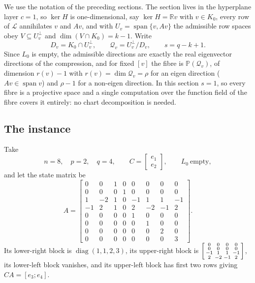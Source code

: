 \documentclass[journal]{IEEEtran}
\theoremstyle{plainn}
\theoremstyle{remark}
\begin{document}
We use the notation of the preceding sections. The section lives in the hyperplane layer $c=1$, so
$\ker H$ is one-dimensional, say $\ker H=\mathbb{R}v$ with $v\in K_0$, every row of $\mathcal{L}$
annihilates $v$ and $Av$, and with $U_v=\operatorname{span}\{v,Av\}$ the admissible row spaces obey
$V\subseteq U_v^{\perp}$ and $\dim(V\cap K_0)=k-1$. Write
\begin{equation}\label{sec6:eq:defs}
D_v=K_0\cap U_v^{\perp},\qquad \mathcal{Q}_v=U_v^{\perp}/D_v,\qquad s=q-k+1 .
\end{equation}
Since $L_0$ is empty, the admissible directions are exactly the real eigenvector directions of the
compression, and for fixed $[v]$ the fibre is $\mathbb{P}(\mathcal{Q}_v)$, of dimension $r(v)-1$ with
$r(v)=\dim\mathcal{Q}_v=\rho$ for an eigen direction ($Av\in\operatorname{span}v$) and $\rho-1$ for a
non-eigen direction. In this section $s=1$, so every fibre is a projective space and a single
computation over the function field of the fibre covers it entirely: no chart decomposition is needed.

\subsection{The instance}\label{sec6:sub:instance}

Take
\begin{equation}\label{sec6:eq:data}
n=8,\quad p=2,\quad q=4,\qquad
C=\begin{bmatrix}e_1\\ e_2\end{bmatrix},\qquad L_0\ \text{empty},
\end{equation}
and let the state matrix be
\begin{equation}\label{sec6:eq:A}
A=\begin{bmatrix}
0&0&1&0&0&0&0&0\\
0&0&0&1&0&0&0&0\\
1&-2&1&0&-1&1&1&-1\\
-1&2&1&0&2&-2&-1&2\\
0&0&0&0&1&0&0&0\\
0&0&0&0&0&1&0&0\\
0&0&0&0&0&0&2&0\\
0&0&0&0&0&0&0&3
\end{bmatrix}.
\end{equation}
Its lower-right block is $\operatorname{diag}(1,1,2,3)$, its upper-right block is
$\begin{bsmallmatrix}0&0&0&0\\0&0&0&0\\-1&1&1&-1\\2&-2&-1&2\end{bsmallmatrix}$, its lower-left block
vanishes, and its upper-left block has first two rows giving $CA=[e_3;e_4]$.
\end{document}
